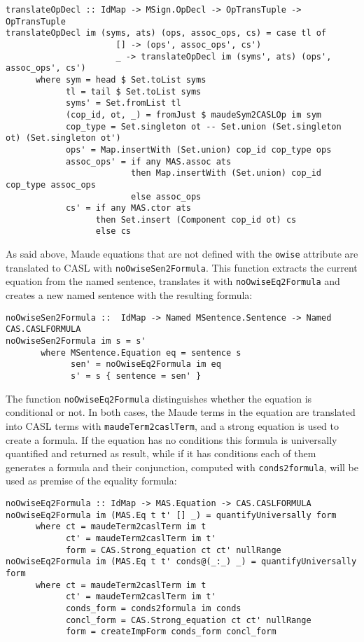 {\codesize
\begin{verbatim}
translateOpDecl :: IdMap -> MSign.OpDecl -> OpTransTuple -> OpTransTuple
translateOpDecl im (syms, ats) (ops, assoc_ops, cs) = case tl of
                      [] -> (ops', assoc_ops', cs')
                      _ -> translateOpDecl im (syms', ats) (ops', assoc_ops', cs')
      where sym = head $ Set.toList syms
            tl = tail $ Set.toList syms
            syms' = Set.fromList tl
            (cop_id, ot, _) = fromJust $ maudeSym2CASLOp im sym
            cop_type = Set.singleton ot -- Set.union (Set.singleton ot) (Set.singleton ot')
            ops' = Map.insertWith (Set.union) cop_id cop_type ops
            assoc_ops' = if any MAS.assoc ats
                         then Map.insertWith (Set.union) cop_id cop_type assoc_ops
                         else assoc_ops
            cs' = if any MAS.ctor ats
                  then Set.insert (Component cop_id ot) cs
                  else cs
\end{verbatim}
}

As said above, Maude equations that are not defined with the \verb"owise"
attribute are translated to CASL with \verb"noOwiseSen2Formula". This
function extracts the current equation from the named sentence, translates
it with \verb"noOwiseEq2Formula" and creates a new named sentence
with the resulting formula:

{\codesize
\begin{verbatim}
noOwiseSen2Formula ::  IdMap -> Named MSentence.Sentence -> Named CAS.CASLFORMULA
noOwiseSen2Formula im s = s'
       where MSentence.Equation eq = sentence s
             sen' = noOwiseEq2Formula im eq
             s' = s { sentence = sen' }
\end{verbatim}
}

The function \verb"noOwiseEq2Formula" distinguishes whether the equation
is conditional or not. In both cases, the Maude terms in the equation
are translated into CASL terms with \verb"maudeTerm2caslTerm", and a
strong equation is used to create a formula. If the equation has no
conditions this formula is universally quantified and returned as result,
while if it has conditions each of them generates a formula and their
conjunction, computed with \verb"conds2formula", will be used as premise
of the equality formula:

{\codesize
\begin{verbatim}
noOwiseEq2Formula :: IdMap -> MAS.Equation -> CAS.CASLFORMULA
noOwiseEq2Formula im (MAS.Eq t t' [] _) = quantifyUniversally form
      where ct = maudeTerm2caslTerm im t
            ct' = maudeTerm2caslTerm im t'
            form = CAS.Strong_equation ct ct' nullRange
noOwiseEq2Formula im (MAS.Eq t t' conds@(_:_) _) = quantifyUniversally form
      where ct = maudeTerm2caslTerm im t
            ct' = maudeTerm2caslTerm im t'
            conds_form = conds2formula im conds
            concl_form = CAS.Strong_equation ct ct' nullRange
            form = createImpForm conds_form concl_form
\end{verbatim}
}

